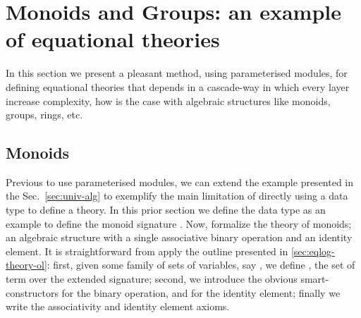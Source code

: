 \section{Monoids and Groups: an example of equational theories}
\label{sec:extheories}

In this section we present a pleasant method, using parameterised modules, for
defining equational theories that depends in a cascade-way in which every layer
increase complexity, how is the case with algebraic structures like monoids,
groups, rings, etc.

\subsection{Monoids}

Previous to use parameterised modules, we can extend the example presented in
the Sec.~\ref{sec:univ-alg} to exemplify the main limitation of directly using a
data type to define a theory. In this prior section we define the data type
 as an example to define the monoid signature
. Now, formalize the theory of monoids; \ie an
algebraic structure with a single associative binary operation and an identity
element. It is straightforward from apply the outline presented in
\ref{sec:eqlog-theory-ol}: first, given some family of sets of variables, say
\AgdaSpace{} \AgdaSymbol{:}\AgdaSpace{} 
, we define
\AgdaSpace{} \AgdaSymbol{=}\AgdaSpace{} 
\AgdaSpace{}\AgdaSpace{}
, the set of term over the
extended signature; second, we introduce the obvious smart-constructors
\AgdaSpace{}\AgdaSpace{}
 for the binary operation, and  for the identity
element; finally we write the associativity and identity element axioms.

